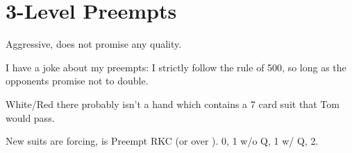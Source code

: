\documentclass[main]{subfile}
\begin{document}
	
	\chapter{3-Level Preempts}
	
	Aggressive, does not promise any quality. 
	
	I have a joke about my preempts: I strictly follow the rule of 500, so long as the opponents promise not to double.
	
	White/Red there probably isn't a hand which contains a 7 card suit that Tom would pass.
	
	New suits are forcing,  is Preempt RKC (or  over ). 0, 1 w/o Q, 1 w/ Q, 2.
	
\end{document}
